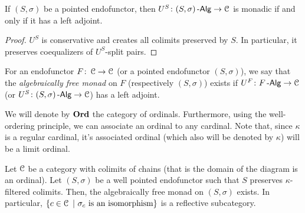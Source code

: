 \documentclass[a4paper,11pt,oneside,openany]{scrbook}
\begin{document}
\begin{lemma}
	If $(S,\sigma)$ be a pointed endofunctor, then
    $U^S\colon(S,\sigma)\operatorname{-\mathsf{Alg}}\to\operatorname{\mathcal{C}}$ is monadic if and only if it has a left
    adjoint.
\end{lemma}
\begin{proof}
	$U^S$ is conservative and creates all colimits preserved by $S$. In particular, it preserves coequalizers of $U^S$-split pairs.
\end{proof}
\begin{defn}
	For an endofunctor $F\colon\operatorname{\mathcal{C}}\to\operatorname{\mathcal{C}}$ (or a pointed endofunctor $(S,\sigma)$), we say that the \emph{algebraically free monad} on $F$ (respectively  $(S,\sigma)$) exists if $U^F\colon F\operatorname{-\mathsf{Alg}}\to\operatorname{\mathcal{C}}$ (or $U^S\colon(S,\sigma)\operatorname{-\mathsf{Alg}}\to\operatorname{\mathcal{C}}$) has a left adjoint.
\end{defn}

We will denote by $\operatorname{\mathbf{Ord}}$ the category of ordinals. Furthermore, using
the well-ordering principle, we can associate an ordinal to any cardinal.
Note that, since $\kappa$ is a regular cardinal, it's associated ordinal
(which also will be denoted by $\kappa$) will be a limit ordinal.

\begin{thm}
	Let $\operatorname{\mathcal{C}}$ be a category with colimits of chains (that is the domain of the diagram is an ordinal). Let $(S,\sigma)$ be a well pointed endofunctor such that $S$ preserves $\kappa$-filtered colimits. Then, the algebraically free monad on $(S,\sigma)$ exists. In particular, $\{c\in\C\ |\ \sigma_c\text{ is an isomorphism}\}$ is a reflective subcategory.
\end{thm}
\end{document}
